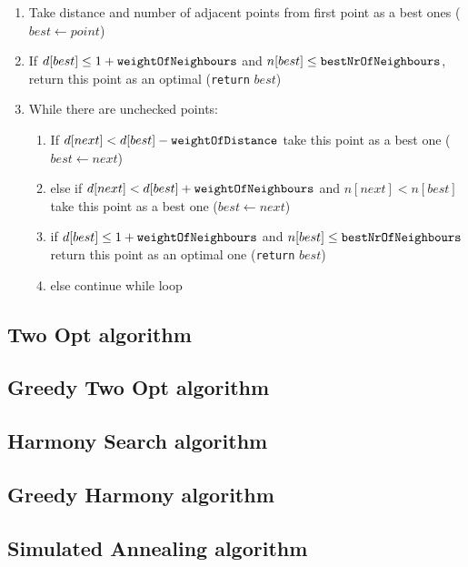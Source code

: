 \documentclass[titlepage]{article}
\begin{document}
\begin{enumerate}
	\item Take distance and number of adjacent points from first point as a best ones ($best \leftarrow point$)
	\item If $d[best] \leq 1 + \mbox{\texttt{weightOfNeighbours}}$ and $n[best] \leq \mbox{\texttt{bestNrOfNeighbours}}$, return this point as an optimal (\texttt{return} $best$)
	\item While there are unchecked points:
	
	\begin{enumerate}[label*=\arabic*.]
		\item If $d[next] < d[best] - \mbox{\texttt{weightOfDistance}}$ take this point as a best one ($best \leftarrow next$)
		\item else if $d[next] < d[best] + \mbox{\texttt{weightOfNeighbours}}$ and $n[next] < n[best]$ take this point as a best one ($best \leftarrow next$)
		\item if $d[best] \leq 1 + \mbox{\texttt{weightOfNeighbours}}$ and $n[best] \leq \mbox{\texttt{bestNrOfNeighbours}}$ return this point as an optimal one (\texttt{return} $best$)
		\item else continue while loop
	\end{enumerate}
\end{enumerate}


\subsection{Two Opt algorithm}



\subsection{Greedy Two Opt algorithm}

\subsection{Harmony Search algorithm}

\subsection{Greedy Harmony algorithm}

\subsection{Simulated Annealing algorithm}
\end{document}
